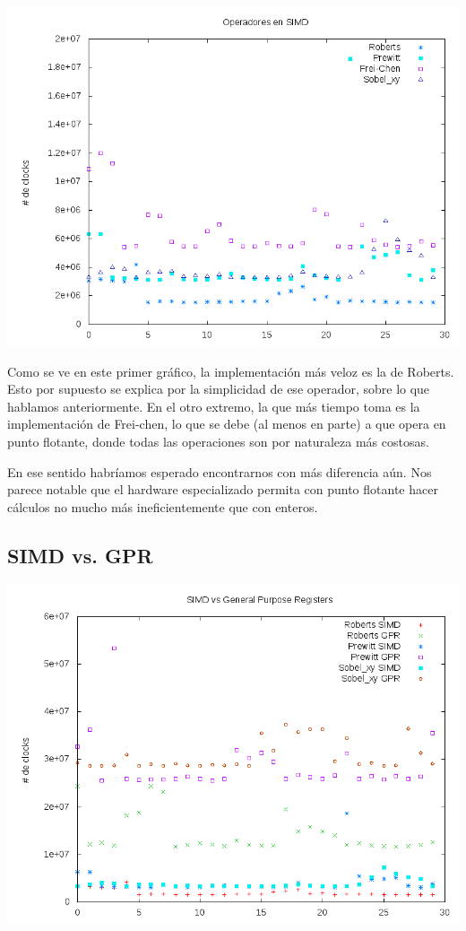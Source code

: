 \includegraphics[scale=0.5]{../resultados/operadores.png}

Como se ve en este primer gráfico, la implementación más veloz es la de Roberts.
Esto por supuesto se explica por la simplicidad de ese operador, sobre lo que
hablamos anteriormente. En el otro extremo, la que más tiempo toma es la implementación
de Frei-chen, lo que se debe (al menos en parte) a que opera en punto flotante,
donde todas las operaciones son por naturaleza más costosas.

En ese sentido habríamos esperado encontrarnos con más diferencia aún. Nos parece
notable que el hardware especializado permita con punto flotante hacer cálculos no
mucho más ineficientemente que con enteros.

\subsection{SIMD vs. GPR}

\includegraphics[scale=0.5]{../resultados/simd.png}

